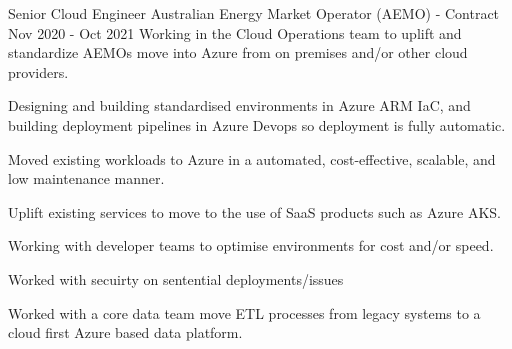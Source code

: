 \begin{cventries}
  \cventryextended
  {Senior Cloud Engineer} %
  {Australian Energy Market Operator (AEMO) - Contract}
  {} %
  {Nov 2020 - Oct 2021} %
  {Working in the Cloud Operations team to uplift and standardize AEMOs move
    into
    Azure from on premises and/or other cloud providers.}
  {
    \begin{cvitems} %
      \item {Designing and building standardised environments in Azure ARM IaC,
                  and building deployment pipelines in Azure Devops so
                  deployment is fully
                  automatic.}
      \item {Moved existing workloads to Azure in a automated, cost-effective,
                  scalable, and low maintenance manner.}
      \item {Uplift existing services to move to the use of SaaS products such
                  as
                  Azure AKS.}
      \item {Working with developer teams to optimise environments for cost
                  and/or speed.}
      \item {Worked with secuirty on sentential deployments/issues }
      \item {Worked with a core data team move ETL processes from legacy
                  systems
                  to a cloud first Azure based data platform.}
    \end{cvitems}
  }


\end{cventries}
